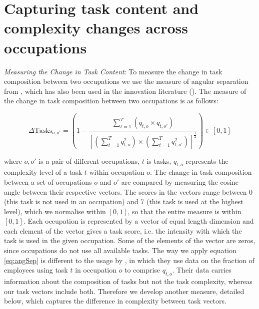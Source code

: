 \documentclass[12pt,authoryear]{elsarticle}
\begin{document}
	
	
	\section{Capturing task content and complexity changes across occupations}
	\label{sec:measures}
\textit{Measuring the Change in Task Content}: To measure the change in task composition between two occupations we use the measure of angular separation from \cite{Gathmann2010}, which has also been used in the innovation literature (\cite{Jaffe1986}). The measure of the change in task composition between two occupations is as follows:
	
	
	\begin{equation}
	\label{eq:angSep}
	\Delta \text{Tasks}_{o,o'} = \left(1 - \frac{\sum_{t=1}^{T}(q_{t,o}\times q_{t,o'})}{\left[(\sum_{t=1}^{T}q_{t,o}^{2})\times(\sum_{t=1}^{T}q_{t,o'}^{2})\right]^{\frac{1}{2}}}\right)   \in [0,1]
	\end{equation}
	
	\noindent where $o,o'$ is a pair of different occupations, $t$ is tasks, $q_{t,o}$ represents the complexity level of a task $t$ within occupation $o$. The change in task composition between a set of occupations $o$ and $o'$ are compared by measuring the cosine angle between their respective vectors. The scores in the vectors range between 0 (this task is not used in an occupation) and 7 (this task is used at the highest level), which we normalise within $[0,1]$, so that the entire measure is within $[0,1]$. Each occupation is represented by a vector of equal length dimension and each element of the vector gives a task score, i.e. the intensity with which the task is used in the given occupation. Some of the elements of the vector are zeros, since occupations do not use all available tasks. 
	The way we apply equation \ref{eq:angSep} is different to the usage by \cite{Gathmann2010}, in which they use data on the fraction of employees using task $t$ in occupation $o$ to comprise $q_{t,o}$. Their data carries information about the composition of tasks but not the task complexity, whereas our task vectors include both. Therefore we develop another measure, detailed below, which captures the difference in complexity between task vectors.
	
\end{document}
